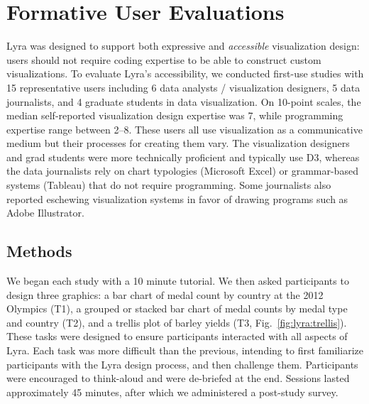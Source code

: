 
\vspace{-10pt}

\section{Formative User Evaluations}

\vspace{-10pt}

Lyra was designed to support both expressive and \emph{accessible} visualization
design: users should not require coding expertise to be able to construct custom
visualizations. To evaluate Lyra's accessibility, we conducted first-use studies
with 15 representative users including 6 data analysts / visualization
designers, 5 data journalists, and 4 graduate students in data visualization. On
10-point scales, the median self-reported visualization design expertise was 7,
while programming expertise range between 2--8. These users all use
visualization as a communicative medium but their processes for creating them
vary. The visualization designers and grad students were more technically
proficient and typically use D3, whereas the data journalists rely on chart
typologies (Microsoft Excel) or grammar-based systems (Tableau) that do not
require programming. Some journalists also reported eschewing visualization
systems in favor of drawing programs such as Adobe Illustrator.

\vspace{-10pt}

\subsection{Methods}

\vspace{-7pt}

We began each study with a 10 minute tutorial. We then asked participants to
design three graphics: a bar chart of medal count by country at the 2012
Olympics (T1), a grouped or stacked bar chart of medal counts by medal type and
country (T2), and a trellis plot of barley yields (T3,
Fig.~\ref{fig:lyra:trellis}). These tasks were designed to ensure participants
interacted with all aspects of Lyra. Each task was more difficult than the
previous, intending to first familiarize participants with the Lyra design
process, and then challenge them. Participants were encouraged to think-aloud
and were de-briefed at the end. Sessions lasted approximately 45 minutes, after
which we administered a post-study survey.

